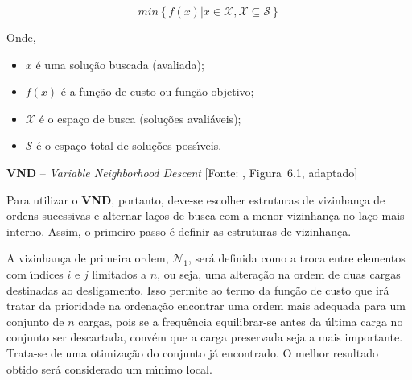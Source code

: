 \begin{equation} \label{eq:VNDobj}
    min \left\{ f \left( x \right) | x \in \mathcal{X}, \mathcal{X} \subseteq \mathcal{S} \right\}
\end{equation}

Onde,

\begin{itemize}
    \item[] $x$ {\'e} uma solu{\c c}{\~a}o buscada (avaliada);
    \item[] $f \left( x \right)$ {\'e} a fun{\c c}{\~a}o de custo ou fun{\c c}{\~a}o objetivo;
    \item[] $\mathcal{X}$ {\'e} o espa{\c c}o de busca (solu{\c c}{\~o}es avali{\'a}veis);
    \item[] $\mathcal{S}$ {\'e} o espa{\c c}o total de solu{\c c}{\~o}es poss{\'\i}veis.
\end{itemize}

\begin{algorithm}[!h]
	\caption[\textbf{VND} \--- \textit{Variable Neighborhood Descent}]{\textbf{VND} \--- \textit{Variable Neighborhood Descent} [Fonte: \citeauthor{hansen2019}, Figura~6.1, adaptado]}
	\label{alg:vnd}
	\begin{algorithmic}
				\ELSE
				\ENDIF
			\ENDWHILE
		\ENDWHILE
	\end{algorithmic}
\end{algorithm}

Para utilizar o \textbf{VND}, portanto, deve-se escolher estruturas de vizinhan{\c c}a de ordens sucessivas e alternar la{\c c}os de busca com a menor vizinhan{\c c}a no la{\c c}o mais interno. Assim, o primeiro passo {\'e} definir as estruturas de vizinhan{\c c}a.

A vizinhan{\c c}a de primeira ordem, $\mathcal{N}_{1}$, ser{\'a} definida como a troca entre elementos com {\'\i}ndices $i$ e $j$ limitados a $n$, ou seja, uma altera{\c c}{\~a}o na ordem de duas cargas destinadas ao desligamento. Isso permite ao termo da fun{\c c}{\~a}o de custo que ir{\'a} tratar da prioridade na ordena{\c c}{\~a}o encontrar uma ordem mais adequada para um conjunto de $n$ cargas, pois se a frequ{\^e}ncia equilibrar-se antes da {\'u}ltima carga no conjunto ser descartada, conv{\'e}m que a carga preservada seja a mais importante. Trata-se de uma otimiza{\c c}{\~a}o do conjunto j{\'a} encontrado. O melhor resultado obtido ser{\'a} considerado um m{\'\i}nimo local.

